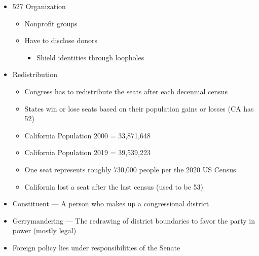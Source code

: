 \documentclass[12pt]{article}
\begin{document}
\begin{itemize}
\begin{itemize}
    \end{itemize}

  \item 527 Organization

    \begin{itemize}

      \item Nonprofit groups

      \item Have to disclose donors

        \begin{itemize}

          \item Shield identities through loopholes

        \end{itemize}

    \end{itemize}

  \item Redistribution

    \begin{itemize}

      \item Congress has to redistribute the seats after each decennial census

      \item States win or lose seats based on their population gains or losses (CA has 52)

      \item California Population 2000 = 33,871,648

      \item California Population 2019 = 39,539,223

      \item One seat represents roughly 730,000 people per the 2020 US Census

      \item California lost a seat after the last census (used to be 53)

    \end{itemize}

  \item Constituent — A person who makes up a congressional district

  \item Gerrymandering — The redrawing of district boundaries to favor the party in power (mostly legal)

  \item Foreign policy lies under responsibilities of the Senate


\end{itemize}
\end{document}
